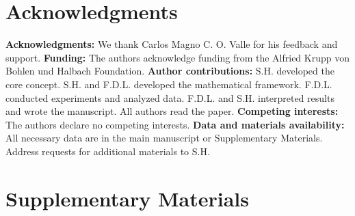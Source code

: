 \documentclass[12pt]{article}
\begin{document}
\section*{Acknowledgments}
\textbf{Acknowledgments:} We thank Carlos Magno C. O. Valle for his feedback and support.
\textbf{Funding:} The authors acknowledge funding from the Alfried Krupp von Bohlen und Halbach Foundation.
\textbf{Author contributions:} S.H. developed the core concept. S.H. and F.D.L. developed the mathematical framework. F.D.L. conducted experiments and analyzed data. F.D.L. and S.H. interpreted results and wrote the manuscript. All authors read the paper.
\textbf{Competing interests:} The authors declare no competing interests.
\textbf{Data and materials availability:} All necessary data are in the main manuscript or Supplementary Materials. Address requests for additional materials to S.H.

\beginsupplement
\newpage
\section*{Supplementary Materials}
\label{sec:supplementary_materials_revised}


\renewcommand\refname{References and Notes}


\end{document}
